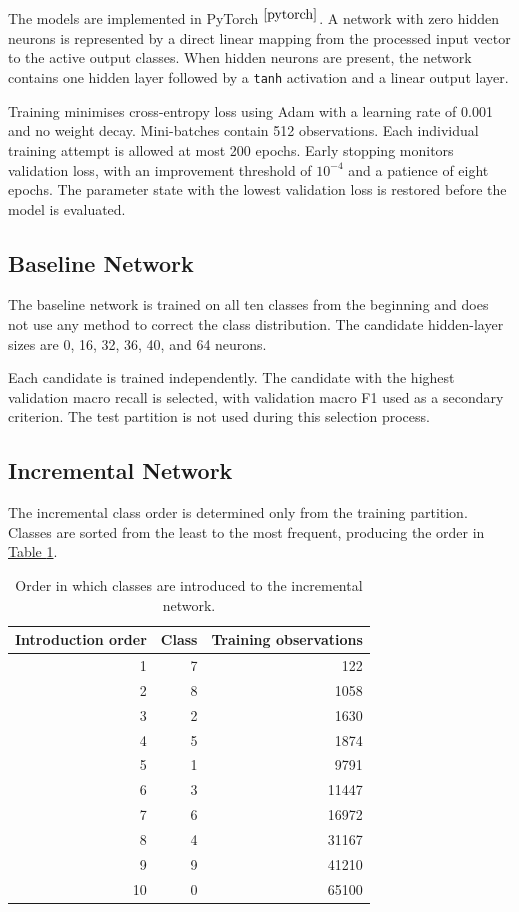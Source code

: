 \documentclass[conference]{IEEEtran}
\begin{document}
The models are implemented in PyTorch $^{\cite{pytorch}}$. A network with zero hidden neurons is represented by a direct linear mapping from the processed input vector to the active output classes. When hidden neurons are present, the network contains one hidden layer followed by a \texttt{tanh} activation and a linear output layer.

Training minimises cross-entropy loss using Adam with a learning rate of 0.001 and no weight decay. Mini-batches contain 512 observations. Each individual training attempt is allowed at most 200 epochs. Early stopping monitors validation loss, with an improvement threshold of $10^{-4}$ and a patience of eight epochs. The parameter state with the lowest validation loss is restored before the model is evaluated.

\subsection{Baseline Network}

The baseline network is trained on all ten classes from the beginning and does not use any method to correct the class distribution. The candidate hidden-layer sizes are 0, 16, 32, 36, 40, and 64 neurons.

Each candidate is trained independently. The candidate with the highest validation macro recall is selected, with validation macro F1 used as a secondary criterion. The test partition is not used during this selection process.

\subsection{Incremental Network}

The incremental class order is determined only from the training partition. Classes are sorted from the least to the most frequent, producing the order in \hyperref[tab:incremental_order]{Table \ref*{tab:incremental_order}}.

\begin{table}[H]
    \centering
    \caption{Order in which classes are introduced to the incremental network.}
    \label{tab:incremental_order}
    \scriptsize
    \begin{tabular}{rrr}
        \toprule
        Introduction order & Class & Training observations \\
        \midrule
        1 & 7 & 122 \\
        2 & 8 & 1058 \\
        3 & 2 & 1630 \\
        4 & 5 & 1874 \\
        5 & 1 & 9791 \\
        6 & 3 & 11447 \\
        7 & 6 & 16972 \\
        8 & 4 & 31167 \\
        9 & 9 & 41210 \\
        10 & 0 & 65100 \\
        \bottomrule
    \end{tabular}
\end{table}
\end{document}
